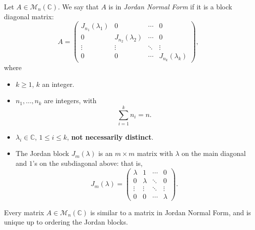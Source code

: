 \documentclass[12pt]{article}
\begin{document}
\begin{definition}
	Let $A \in \mathcal{M}_n(\mathbb{C})$. We say that $A$ is in \textit{Jordan Normal Form} if it is a block diagonal matrix:
	\[
	A =
	\begin{pmatrix}
		J_{n_1}(\lambda_1) & 0 & \cdots & 0 \\
		0 & J_{n_2}(\lambda_2) & \cdots & 0 \\
		\vdots & \vdots & \ddots & \vdots \\
		0 & 0 & \cdots & J_{n_k}(\lambda_k)
	\end{pmatrix}
	,\]
	where
	\begin{itemize}
		\item $k \geq 1$, $k$ an integer.
		\item $n_1, \ldots, n_k$ are integers, with
			\[
			\sum_{i = 1}^{k} n_i = n
			.\]
		\item $\lambda_i \in \mathbb{C}$, $1 \leq i \leq k$, \textbf{not necessarily distinct}.
		\item The Jordan block $J_{m}(\lambda)$ is an $m \times m$ matrix with $\lambda$ on the main diagonal and $1$'s on the subdiagonal above: that is,
			\[
				J_{m}(\lambda) =
			\begin{pmatrix}
				 \lambda & 1 & \cdots & 0 \\
				 0 & \lambda & \ddots & 0 \\
				 \vdots & \vdots & \ddots & \vdots \\
				 0 & 0 & \cdots & \lambda
			\end{pmatrix}
			.\] 
	\end{itemize}
\end{definition}

\begin{theorem}
	Every matrix $A \in \mathcal{M}_n(\mathbb{C})$ is similar to a matrix in Jordan Normal Form, and is unique up to ordering the Jordan blocks.
\end{theorem}
\end{document}
